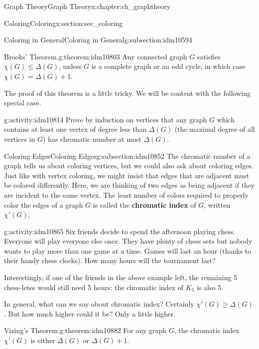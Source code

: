 \documentclass[oneside,10pt,]{book}
\newcommand{\terminology}[1]{\textbf{#1}}
\numberwithin{equation}{chapter}
\begin{document}
\begin{chapterptx}{Graph Theory}{}{Graph Theory}{}{}{x:chapter:ch_graphtheory}
\begin{sectionptx}{Coloring}{}{Coloring}{}{}{x:section:sec_coloring}
\begin{subsectionptx}{Coloring in General}{}{Coloring in General}{}{}{g:subsection:idm10594}
\begin{theorem}{Brooks' Theorem.}{}{g:theorem:idm10803}%
 Any connected graph \(G\) satisfies \(\chi(G) \le \Delta(G)\), unless \(G\) is a complete graph or an odd cycle, in which case \(\chi(G) = \Delta(G) + 1\).%
\end{theorem}
The proof of this theorem is a little tricky.  We will be content with the following special case.%
\begin{activity}{}{g:activity:idm10814}%
Prove by induction on vertices that any graph \(G\) which contains at least one vertex of degree less than \(\Delta(G)\) (the maximal degree of all vertices in \(G\)) has chromatic number at most \(\Delta(G)\).%
\end{activity}
\end{subsectionptx}
%
%
\typeout{************************************************}
\typeout{************************************************}
%
\begin{subsectionptx}{Coloring Edges}{}{Coloring Edges}{}{}{g:subsection:idm10852}
The chromatic number of a graph tells us about coloring vertices, but we could also ask about coloring edges. Just like with vertex coloring, we might insist that edges that are adjacent must be colored differently. Here, we are thinking of two edges as being adjacent if they are incident to the same vertex. The least number of colors required to properly color the edges of a graph \(G\) is called the \terminology{chromatic index} of \(G\), written \(\chi'(G)\)\label{g:notation:idm10861}.%
\begin{activity}{}{g:activity:idm10865}%
Six friends decide to spend the afternoon playing chess. Everyone will play everyone else once. They have plenty of chess sets but nobody wants to play more than one game at a time. Games will last an hour (thanks to their handy chess clocks). How many hours will the tournament last?%
\end{activity}
Interestingly, if one of the friends in the above example left, the remaining 5 chess-letes would still need 5 hours: the chromatic index of \(K_5\) is also 5.%
\par
In general, what can we say about chromatic index? Certainly \(\chi'(G) \ge \Delta(G)\). But how much higher could it be? Only a little higher.%
\begin{theorem}{Vizing's Theorem.}{}{g:theorem:idm10882}%
 For any graph \(G\), the chromatic index \(\chi'(G)\) is either \(\Delta(G)\) or \(\Delta(G) + 1\).%

\end{theorem}
\end{subsectionptx}
\end{sectionptx}
\end{chapterptx}
\end{document}
